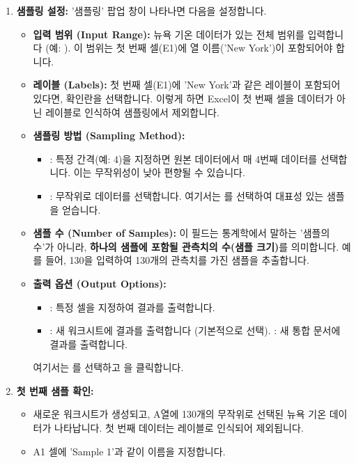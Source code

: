 \documentclass[11pt,a4paper]{article}
\theoremstyle{definition}
\begin{document}
\begin{enumerate}
    \item \textbf{샘플링 설정:}
    '샘플링' 팝업 창이 나타나면 다음을 설정합니다.
    \begin{itemize}
        \item \textbf{입력 범위 (Input Range):} 뉴욕 기온 데이터가 있는 전체 범위를 입력합니다 (예: ). 이 범위는 첫 번째 셀(E1)에 열 이름('New York')이 포함되어야 합니다.
        \item \textbf{레이블 (Labels):} 첫 번째 셀(E1)에 'New York'과 같은 레이블이 포함되어 있다면,  확인란을 선택합니다. 이렇게 하면 Excel이 첫 번째 셀을 데이터가 아닌 레이블로 인식하여 샘플링에서 제외합니다.
        \item \textbf{샘플링 방법 (Sampling Method):}
        \begin{itemize}
            \item {}: 특정 간격(예: 4)을 지정하면 원본 데이터에서 매 4번째 데이터를 선택합니다. 이는 무작위성이 낮아 편향될 수 있습니다.
            \item {}: 무작위로 데이터를 선택합니다. 여기서는 를 선택하여 대표성 있는 샘플을 얻습니다.
        \end{itemize}
        \item \textbf{샘플 수 (Number of Samples):} 이 필드는 통계학에서 말하는 '샘플의 수'가 아니라, \textbf{하나의 샘플에 포함될 관측치의 수(샘플 크기)}를 의미합니다. 예를 들어, 130을 입력하여 130개의 관측치를 가진 샘플을 추출합니다.
        \item \textbf{출력 옵션 (Output Options):}
        \begin{itemize}
            \item {}: 특정 셀을 지정하여 결과를 출력합니다.
            \item {}: 새 워크시트에 결과를 출력합니다 (기본적으로 선택).
            : 새 통합 문서에 결과를 출력합니다.
        \end{itemize}
        여기서는 를 선택하고 을 클릭합니다.
    \end{itemize}

    \item \textbf{첫 번째 샘플 확인:}
    \begin{itemize}
        \item 새로운 워크시트가 생성되고, A열에 130개의 무작위로 선택된 뉴욕 기온 데이터가 나타납니다. 첫 번째 데이터는 레이블로 인식되어 제외됩니다.
        \item A1 셀에 'Sample 1'과 같이 이름을 지정합니다.
    \end{itemize}


\end{enumerate}
\end{document}
